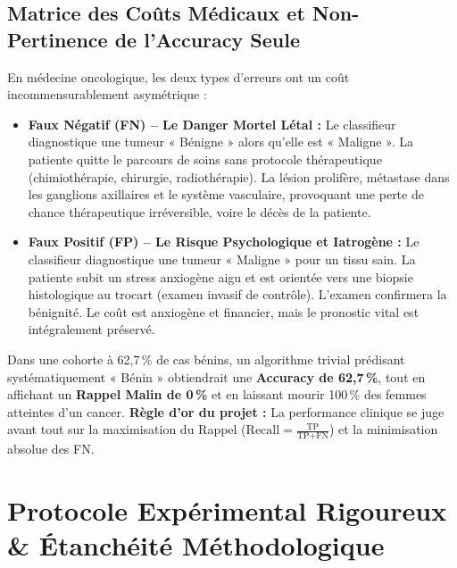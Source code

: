 \documentclass[10pt,a4paper]{article}
\begin{document}
\subsection{Matrice des Coûts Médicaux et Non-Pertinence de l'Accuracy Seule}
En médecine oncologique, les deux types d'erreurs ont un coût incommensurablement asymétrique :
\begin{itemize}[leftmargin=0.6cm, itemsep=3pt]
	\item \textbf{Faux Négatif (FN) -- Le Danger Mortel Létal :} Le classifieur diagnostique une tumeur « Bénigne » alors qu'elle est « Maligne ». La patiente quitte le parcours de soins sans protocole thérapeutique (chimiothérapie, chirurgie, radiothérapie). La lésion prolifère, métastase dans les ganglions axillaires et le système vasculaire, provoquant une perte de chance thérapeutique irréversible, voire le décès de la patiente.
	\item \textbf{Faux Positif (FP) -- Le Risque Psychologique et Iatrogène :} Le classifieur diagnostique une tumeur « Maligne » pour un tissu sain. La patiente subit un stress anxiogène aigu et est orientée vers une biopsie histologique au trocart (examen invasif de contrôle). L'examen confirmera la bénignité. Le coût est anxiogène et financier, mais le pronostic vital est intégralement préservé.
\end{itemize}

\begin{tcolorbox}[redbox, title={Démonstration : Pourquoi l'Accuracy Brute est Dangereuse en Santé}]
\small
Dans une cohorte à 62,7\,\% de cas bénins, un algorithme trivial prédisant systématiquement « Bénin » obtiendrait une \textbf{Accuracy de 62,7\,\%}, tout en affichant un \textbf{Rappel Malin de 0\,\%} et en laissant mourir 100\,\% des femmes atteintes d'un cancer.  
\textbf{Règle d'or du projet :} La performance clinique se juge avant tout sur la maximisation du Rappel ($\text{Recall} = \frac{\text{TP}}{\text{TP} + \text{FN}}$) et la minimisation absolue des FN.
\end{tcolorbox}

\section{Protocole Expérimental Rigoureux \& Étanchéité Méthodologique}
\end{document}
